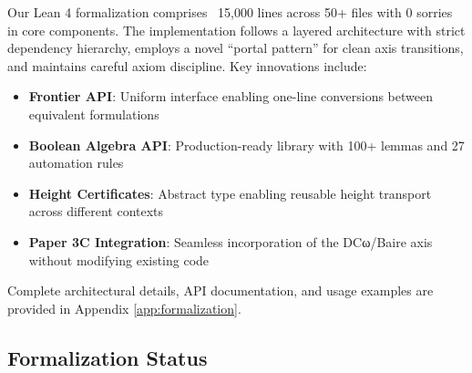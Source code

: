 \documentclass[11pt]{article}
\theoremstyle{plain}
\theoremstyle{definition}
\begin{document}
Our Lean 4 formalization comprises ~15,000 lines across 50+ files with 0 sorries in core components. The implementation follows a layered architecture with strict dependency hierarchy, employs a novel ``portal pattern'' for clean axis transitions, and maintains careful axiom discipline. Key innovations include:

\begin{itemize}
\item \textbf{Frontier API}: Uniform interface enabling one-line conversions between equivalent formulations
\item \textbf{Boolean Algebra API}: Production-ready library with 100+ lemmas and 27 automation rules
\item \textbf{Height Certificates}: Abstract type enabling reusable height transport across different contexts
\item \textbf{Paper 3C Integration}: Seamless incorporation of the DCω/Baire axis without modifying existing code
\end{itemize}

Complete architectural details, API documentation, and usage examples are provided in Appendix \ref{app:formalization}.

\subsection{Formalization Status}
\end{document}
